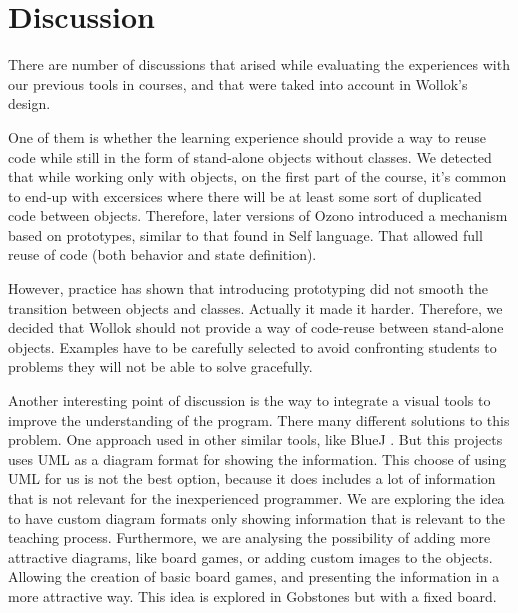 \section{Discussion}
\label{sec:discussion}

There are number of discussions that arised while evaluating the experiences
with our previous tools in courses, and that were taked into account in Wollok's
design.

One of them is whether the learning experience should provide a way to reuse
code while still in the form of stand-alone objects without classes.
We detected that while working only with objects, on the first part of the
course, it's common to end-up with excersices where there will be at least some
sort of duplicated code between objects.
Therefore, later versions of Ozono introduced a mechanism based on prototypes, 
similar to that found in Self language\cite{Ungar87self:the, Ungar91organizingprograms}. 
That allowed full reuse of code (both behavior and state definition).

However, practice has shown that introducing prototyping did not smooth the transition between objects and classes. Actually it made it harder.
Therefore, we decided that Wollok should not provide a way of code-reuse between stand-alone objects.
Examples have to be carefully selected to avoid confronting students to problems they will not be able to solve gracefully.

\medskip 
Another interesting point of discussion is the way to integrate a visual tools to improve the understanding of the program. There many different solutions to this problem. One approach used in other similar tools, like BlueJ \cite{bennedsen_bluej_2010}. But this projects uses UML as a diagram format for showing the information. This choose of using UML for us is not the best option, because it does includes a lot of information that is not relevant for the inexperienced programmer. We are exploring the idea to have custom diagram formats only showing information that is relevant to the teaching process. Furthermore, we are analysing the possibility of adding more attractive diagrams, like board games, or adding custom images to the objects. Allowing the creation of basic board games, and presenting the information in a more attractive way. This idea is explored in Gobstones \cite{lopez_nombre_2012} but with a fixed board.

